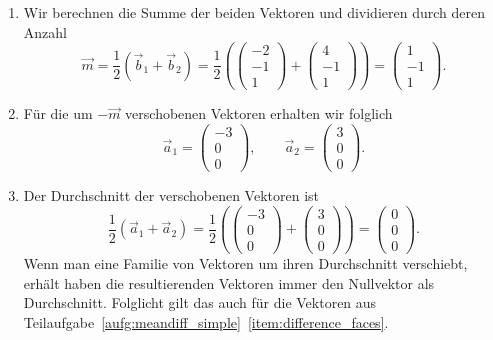 \begin{losung}
	\begin{enumerate}[label=(\alph*)]
		\item Wir berechnen die Summe der beiden Vektoren und dividieren durch deren Anzahl
		\begin{equation*}
			\vec{m}=\frac{1}{2}\left(\vec{b}_1+\vec{b}_2\right)
			=\frac{1}{2}\left(
			\begin{pmatrix}
				-2 \\
				-1 \\
				1
			\end{pmatrix}+
			\begin{pmatrix}
				4 \\
				-1 \\
				1
			\end{pmatrix}
			\right)
			=
			\begin{pmatrix}
				1 \\
				-1 \\
				1
			\end{pmatrix}.
		\end{equation*}
		\item Für die um $-\vec{m}$ verschobenen Vektoren erhalten wir folglich
		\begin{equation*}
			\vec{a}_1=
			\begin{pmatrix}
				-3 \\
				0 \\
				0
			\end{pmatrix},\qquad
			\vec{a}_2=
			\begin{pmatrix}
				3 \\
				0 \\
				0
			\end{pmatrix}.
		\end{equation*}
		\item Der Durchschnitt der verschobenen Vektoren ist
		\begin{equation*}
			\frac{1}{2}\left(\vec{a}_1+\vec{a}_2\right)=
			\frac{1}{2}\left(\begin{pmatrix}
				-3 \\
				0 \\
				0
			\end{pmatrix}+
			\begin{pmatrix}
				3 \\
				0 \\
				0
			\end{pmatrix}\right)=
			\begin{pmatrix}
				0 \\
				0 \\
				0
			\end{pmatrix}.
		\end{equation*}
		Wenn man eine Familie von Vektoren um ihren Durchschnitt verschiebt, erhält haben die resultierenden Vektoren immer den Nullvektor als Durchschnitt.
		Folglicht gilt das auch für die Vektoren aus Teilaufgabe~\ref{aufg:meandiff_simple}~\ref{item:difference_faces}.
	\end{enumerate}
\end{losung}
